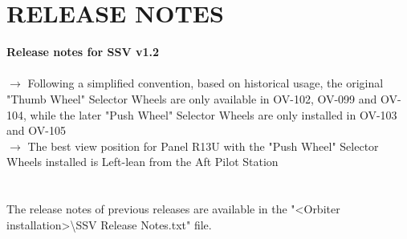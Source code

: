 \documentclass[Space_Shuttle_Vessel_Manual.tex]{subfiles}
\begin{document}
\section{RELEASE NOTES}
\label{sec:release-notes}
\noindent
\textbf{Release notes for SSV v1.2}\\\\
$\rightarrow$ Following a simplified convention, based on historical usage, the original "Thumb Wheel" Selector Wheels are only available in OV-102, OV-099 and OV-104, while the later "Push Wheel" Selector Wheels are only installed in OV-103 and OV-105\\
$\rightarrow$ The best view position for Panel R13U with the "Push Wheel" Selector Wheels installed is Left-lean from the Aft Pilot Station\\
\\
\\
The release notes of previous releases are available in the "<Orbiter installation>\textbackslash SSV Release Notes.txt" file.
\end{document}
